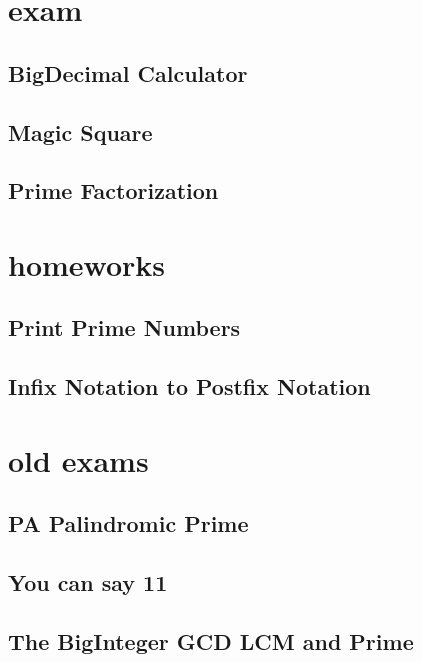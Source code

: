 \section{exam}
    \subsection{BigDecimal Calculator}
            
    \subsection{Magic Square}
        
    \subsection{Prime Factorization}
        

\section{homeworks}
    \subsection{Print Prime Numbers}
            
    \subsection{Infix Notation to Postfix Notation}
        

\section{old exams}
    \subsection{PA Palindromic Prime}
            
    \subsection{You can say 11}
        
    \subsection{The BigInteger GCD LCM and Prime}
        
